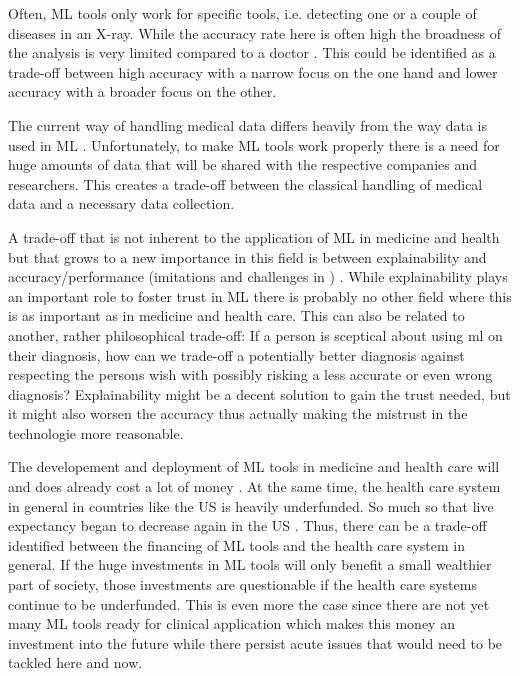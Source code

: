 Often, ML tools only work for specific tools, i.e. detecting one or a couple of diseases in an X-ray. While the accuracy rate here is often high the broadness of the analysis is very limited compared to a doctor \cite{topol2019high}. This could be identified as a trade-off between high accuracy with a narrow focus on the one hand and lower accuracy with a broader focus on the other.


The current way of handling medical data differs heavily from the way data is used in ML \cite{he2019practical}. Unfortunately, to make ML tools work properly there is a need for huge amounts of data that will be shared with the respective companies and researchers. This creates a trade-off between the classical handling of medical data and a necessary data collection.


A trade-off that is not inherent to the application of ML in medicine and health but that grows to a new importance in this field is between explainability and accuracy/performance \cite{topol2019high, kelly2019key} (imitations and challenges in \cite{topol2019high}) . While explainability plays an important role to foster trust in ML there is probably no other field where this is as important as in medicine and health care. This can also be related to another, rather philosophical trade-off: If a person is sceptical about using ml on their diagnosis, how can we trade-off a potentially better diagnosis against respecting the persons wish with possibly risking a less accurate or even wrong diagnosis? Explainability might be a decent solution to gain the trust needed, but it might also worsen the accuracy thus actually making the mistrust in the technologie more reasonable.


The developement and deployment of ML tools in medicine and health care will and does already cost a lot of money  \cite{he2019practical}. At the same time, the health care system in general in countries like the US is heavily underfunded. So much so that live expectancy began to decrease again in the US \cite{topol2019high}. Thus, there can be a trade-off identified between the financing of ML tools and the health care system in general. If the huge investments in ML tools will only benefit a small wealthier part of society, those investments are questionable if the health care systems continue to be underfunded. This is even more the case since there are not yet many ML tools ready for clinical application which makes this money an investment into the future while there persist acute issues that would need to be tackled here and now.


